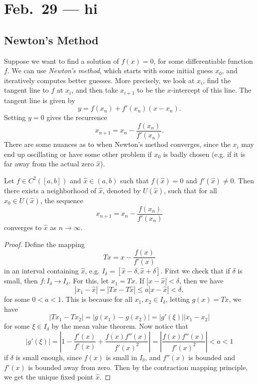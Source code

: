 \chapter{Feb.~29 --- hi}

\section{Newton's Method}
Suppose we want to find a solution of $f(x) = 0$, for
some differentiable function $f$. We can use
\emph{Newton's method}, which starts with some initial
guess $x_0$, and iteratively computes
better guesses. More precisely, we look at $x_i$,
find the tangent line to $f$ at $x_i$, and then
take $x_{i + 1}$ to be the $x$-intercept of this
line. The tangent line is given by
\[
  y = f(x_n) + f'(x_n)(x - x_n).
\]
Setting $y = 0$ gives the recurrence
\[
  x_{n + 1} = x_n - \frac{f(x_n)}{f'(x_n)}.
\]
There are some nuances as to when Newton's method
converges, since the $x_i$ may end up oscillating or
have some other problem if $x_0$ is badly chosen (e.g.
if it is far away from the actual zero $\hat{x}$).

\begin{example}
  Let $f \in C^2([a, b])$ and $\hat{x} \in (a, b)$ such
  that $f(\hat{x}) = 0$ and $f'(\hat{x}) \ne 0$. Then
  there exists a neighborhood of $\hat{x}$, denoted
  by $U(\hat{x})$, such that for all $x_0 \in U(\hat{x})$,
  the sequence
  \[
    x_{n + 1} = x_n - \frac{f(x_n)}{f'(x_n)}
  \]
  converges to $\hat{x}$ as $n \to \infty$.
\end{example}

\begin{proof}
  Define the mapping
  \[
    Tx = x - \frac{f(x)}{f'(x)}
  \]
  in an interval containing $\hat{x}$, e.g.
  $I_{\delta} = [\hat{x} - \delta, \hat{x} + \delta]$.
  First we check that if $\delta$ is small, then
  $f : I_\delta \to I_\delta$. For this, let
  $x_1 = Tx$. If $|x - \hat{x}| < \delta$, then we have
  \[
    |x_1 - \hat{x}| = |Tx - T\hat{x}|
    \le a|x - \hat{x}| < \delta,
  \]
  for some $0 < a < 1$. This is because for all
  $x_1, x_2 \in I_\delta$, letting $g(x) = Tx$, we have
  \[
    |Tx_1 - Tx_2| =
    |g(x_1) - g(x_2)|
    = |g'(\xi)| |x_1 - x_2|
  \]
  for some $\xi \in I_\delta$ by the mean value
  theorem. Now notice that
  \[
    |g'(\xi)| = \left| 1 - \frac{f'(x)}{f'(x)}
    + \frac{f(x)f''(x)}{f'(x)^2} \right|
    = \left| \frac{f(x)f''(x)}{f'(x)^2} \right|
    < a < 1
  \]
  if $\delta$ is small enough, since $f(x)$ is small
  in $I_\delta$, and $f''(x)$ is bounded
  and $f'(x)$ is bounded away from zero. Then by the
  contraction mapping principle, we get the unique
  fixed point $\hat{x}$.
\end{proof}

